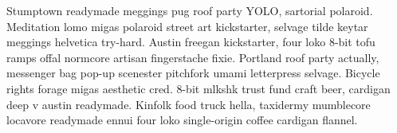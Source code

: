 Stumptown readymade meggings pug roof party YOLO, sartorial polaroid. Meditation lomo migas polaroid street art kickstarter, selvage tilde keytar meggings helvetica try-hard. Austin freegan kickstarter, four loko 8-bit tofu ramps offal normcore artisan fingerstache fixie. Portland roof party actually, messenger bag pop-up scenester pitchfork umami letterpress selvage. Bicycle rights forage migas aesthetic cred. 8-bit mlkshk trust fund craft beer, cardigan deep v austin readymade. Kinfolk food truck hella, taxidermy mumblecore locavore readymade ennui four loko single-origin coffee cardigan flannel.